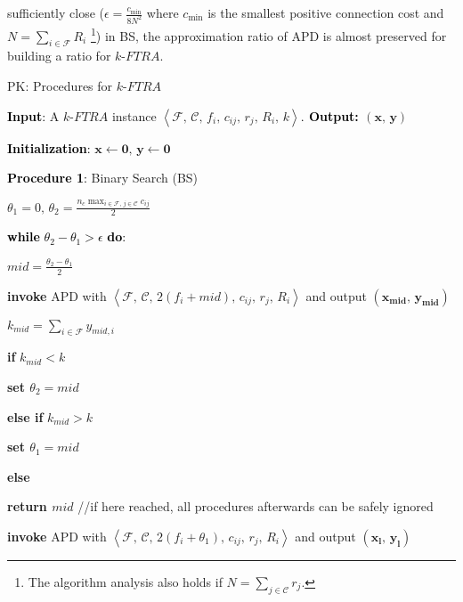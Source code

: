 \documentclass[10pt]{llncs}
\begin{document}
sufficiently close ($\epsilon=\frac{c_{\min}}{8N^{2}}$ where $c_{\min}$
is the smallest positive connection cost and $N=\sum_{i\in\mathcal{F}}R_{i}$
\footnote{The algorithm analysis also holds if $N=\sum_{j\in\mathcal{C}}r_{j}$.}) in BS, the approximation ratio of APD is almost preserved for building
a ratio for $k$-$FTRA$.

\begin{algorithm}
\caption{PK: Procedures for $k$-$FTRA$}


\textbf{\textcolor{black}{Input}}\textcolor{black}{: }A $k$-$FTRA$
instance $\left\langle \mathcal{F},\,\mathcal{C},\, f_{i},\, c_{ij},\, r_{j},\, R_{i},\, k\right\rangle $\textcolor{black}{.}\textbf{\textcolor{black}{{}
Output: }}$\left(\boldsymbol{x},\,\boldsymbol{y}\right)$

\textbf{\textcolor{black}{Initialization}}\textcolor{black}{:} $\boldsymbol{x}\leftarrow\boldsymbol{0},\,\boldsymbol{y}\leftarrow\boldsymbol{0}$

\textbf{\textcolor{black}{Procedure 1}}\textcolor{black}{: }Binary
Search (BS)

$\theta_{1}=0,\,\theta_{2}=\frac{n_{c}\max_{i\in\mathcal{F},\, j\in\mathcal{C}}c_{ij}}{2}$

\textbf{\textcolor{black}{while}}\textcolor{black}{{} $\theta_{2}-\theta_{1}>\epsilon$
}\textbf{\textcolor{black}{do}}\textcolor{black}{:}

\qquad{}$mid=\frac{\theta_{2}-\theta_{1}}{2}$

\qquad{}\textbf{invoke} APD with $\left\langle \mathcal{F},\,\mathcal{C},\,2\left(f_{i}+mid\right),\, c_{ij},\, r_{j},\, R_{i}\right\rangle $
and output $\left(\boldsymbol{x_{mid}},\,\boldsymbol{y_{mid}}\right)$

\qquad{}$k_{mid}=\sum_{i\in\mathcal{F}}y_{mid,i}$

\qquad{}\textbf{if }$k_{mid}<k$

\qquad{}\qquad{}\textbf{set $\theta_{2}=mid$}

\qquad{}\textbf{else if }$k_{mid}>k$

\qquad{}\qquad{}\textbf{set $\theta_{1}=mid$}

\qquad{}\textbf{else}

\qquad{}\qquad{}\textbf{return $mid$ }//if here reached, all procedures
afterwards can be safely ignored

\textbf{invoke} APD with $\left\langle \mathcal{F},\,\mathcal{C},\,2\left(f_{i}+\theta_{1}\right),\, c_{ij},\, r_{j},\, R_{i}\right\rangle $
and output $\left(\boldsymbol{x_{l}},\,\boldsymbol{y_{l}}\right)$


\end{algorithm}
\end{document}
